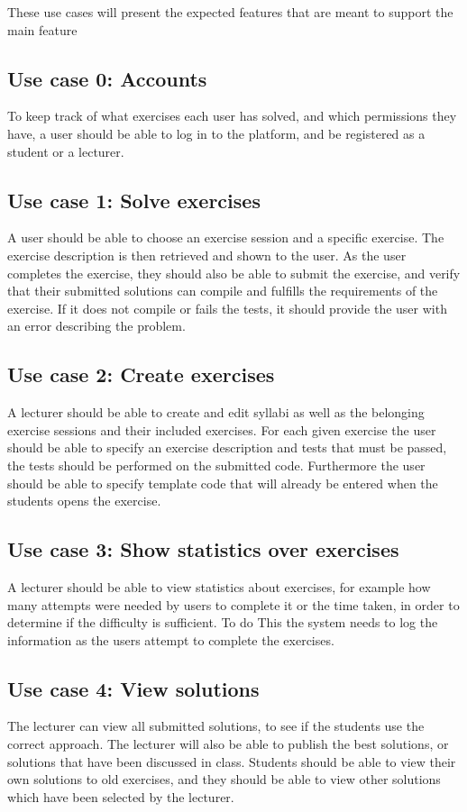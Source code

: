These use cases will present the expected features that are meant to support the main feature
\subsection*{Use case 0: Accounts}
To keep track of what exercises each user has solved, and which permissions they have, a user should be able to log in to the platform, and be registered as a student or a lecturer.

\subsection*{Use case 1: Solve exercises}
A user should be able to choose an exercise session and a specific exercise. The exercise description is then retrieved and shown to the user.
As the user completes the exercise, they should also be able to submit the exercise, and verify that their submitted solutions can compile and fulfills the requirements of the exercise. If it does not compile or fails the tests, it should provide the user with an error describing the problem. 

\subsection*{Use case 2: Create exercises}
A lecturer should be able to create and edit syllabi as well as the belonging exercise sessions and their included exercises. 
For each given exercise the user should be able to specify an exercise description and tests that must be passed, the tests should be performed on the submitted code. Furthermore the user should be able to specify template code that will already be entered when the students opens the exercise.

\subsection*{Use case 3: Show statistics over exercises}
A lecturer should be able to view statistics about exercises, for example how many attempts were needed by users to complete it or the time taken, in order to determine if the difficulty is sufficient. To do This the system needs to log the information as the users attempt to complete the exercises.


\subsection*{Use case 4: View solutions}
The lecturer can view all submitted solutions, to see if the students use the correct approach. The lecturer will also be able to publish the best solutions, or solutions that have been discussed in class.  
Students should be able to view their own solutions to old exercises, and they should be able to view other solutions which have been selected by the lecturer. 


